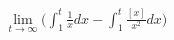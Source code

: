 \documentclass[preview]{standalone}
\begin{document}
\begin{align*}
\lim_{t\to\infty}\Biggr(\int_{1}^{t}\frac{1}{x}dx - \int_{1}^{t}\frac{[x]}{x^2}dx\Biggr)
\end{align*}
\end{document}
